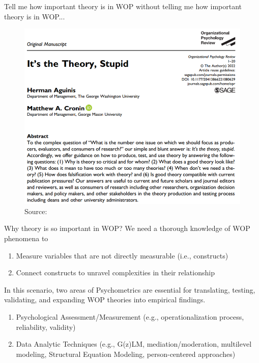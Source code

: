 \documentclass{beamer}
\begin{document}
\begin{frame}{}
Tell me how important theory is in WOP without telling me how important theory is in WOP...
    \begin{figure}
        \centering
        \includegraphics[width=0.75\linewidth]{figs/Aguinis_theoryOPR.png}
        \caption{Source: \textcite[]{aguinis_theoryOPR}}
        \label{fig:enter-label}
    \end{figure}
\end{frame}


\begin{frame}{Why theory is so important in WOP?}
	\small
	We need a thorough knowledge of WOP phenomena to
	\begin{enumerate}
	    \item Measure variables that are not directly measurable (i.e., constructs)
	    \item Connect constructs to unravel complexities in their relationship
	\end{enumerate}
	In this scenario, two areas of Psychometrics are essential for translating, testing, validating, and expanding WOP theories into empirical findings.
	\begin{enumerate}
	    \item Psychological Assessment/Measurement (e.g., operationalization process, reliability, validity) {\scriptsize \parencite[e.g.,][]{cheung2024validity}}
	    \item Data Analytic Techniques (e.g., G(z)LM, mediation/moderation, multilevel modeling, Structural Equation Modeling, person-centered approaches) {\scriptsize \parencite[e.g.,][]{gonzalez2023mlm, morin2018person_centered}}
	\end{enumerate}
\end{frame}
\end{document}
